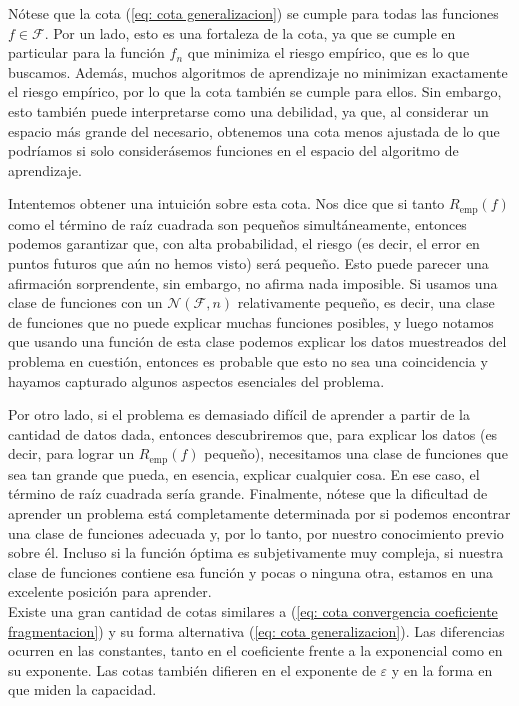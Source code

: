 \documentclass{report}
\begin{document}
Nótese que la cota (\ref{eq: cota generalizacion}) se cumple para todas las funciones \(f \in \mathcal{F}\). 
Por un lado, esto es una fortaleza 
de la cota, ya que se cumple en particular para la función \(f_n\) que minimiza el riesgo empírico, que es lo que 
buscamos. Además, muchos algoritmos de aprendizaje no minimizan exactamente el riesgo empírico, por lo que la cota 
también se cumple para ellos. Sin embargo, esto también puede interpretarse como una debilidad, ya que, al considerar 
un espacio más grande del necesario, obtenemos una cota menos ajustada de lo que podríamos si solo considerásemos
funciones en el espacio del algoritmo de aprendizaje.\newline

Intentemos obtener una intuición sobre esta cota. Nos dice que si tanto \(R_{\text{emp}}(f)\) como el término 
de raíz cuadrada son pequeños simultáneamente, entonces podemos garantizar que, con alta probabilidad, el 
riesgo (es decir, el error en puntos futuros que aún no hemos visto) será pequeño. Esto puede parecer una 
afirmación sorprendente, sin embargo, no afirma nada imposible. Si usamos una clase de funciones con un 
\(\mathcal{N}(\mathcal{F}, n)\) relativamente pequeño, es decir, una clase de funciones que no puede explicar 
muchas funciones posibles, y luego notamos que usando una función de esta clase podemos explicar los datos muestreados 
del problema en cuestión, entonces es probable que esto no sea una coincidencia y hayamos capturado algunos aspectos 
esenciales del problema. \newline

Por otro lado, si el problema es demasiado difícil de aprender a partir de la cantidad de datos dada, entonces 
descubriremos que, para explicar los datos (es decir, para lograr un \(R_{\text{emp}}(f)\) pequeño), necesitamos 
una clase de funciones que sea tan grande que pueda, en esencia, explicar cualquier cosa. En ese caso, el término 
de raíz cuadrada sería grande. Finalmente, nótese que la dificultad de aprender un problema está completamente 
determinada por si podemos encontrar una clase de funciones adecuada y, por lo tanto, por nuestro conocimiento 
previo sobre él. Incluso si la función óptima es subjetivamente muy compleja, si nuestra clase de funciones 
contiene esa función y pocas o ninguna otra, estamos en una excelente posición para aprender.\\

Existe una gran cantidad de cotas similares a (\ref{eq: cota convergencia coeficiente fragmentacion}) 
y su forma alternativa (\ref{eq: cota generalizacion}). Las diferencias ocurren en 
las constantes, tanto en el coeficiente frente a la exponencial como en su exponente. Las cotas también 
difieren en el exponente de \(\varepsilon\) y en la forma en que miden la capacidad.\newline
\end{document}
